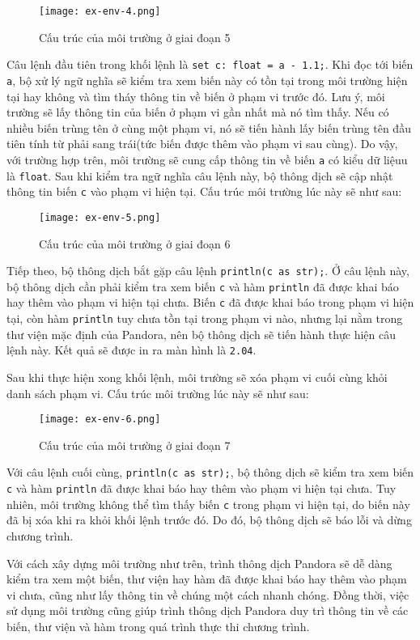 \begin{figure}[H]
    \centering
    \texttt{[image: ex-env-4.png]}
    \caption{Cấu trúc của môi trường ở giai đoạn 5}
\end{figure}

    Câu lệnh đầu tiên trong khối lệnh là \texttt{set c: float = a - 1.1;}. Khi đọc tới biến \texttt{a}, bộ xử lý ngữ nghĩa sẽ kiểm tra xem biến này có tồn tại trong môi trường hiện tại hay không và tìm tháy thông tin về biến ở phạm vi trước đó. Lưu ý, môi trường sẽ lấy thông tin của biến ở phạm vi gần nhất mà nó tìm thấy. Nếu có nhiều biến trùng tên ở cùng một phạm vi, nó sẽ tiến hành lấy biến trùng tên đầu tiên tính từ phải sang trái(tức biến được thêm vào phạm vi sau cùng). Do vậy, với trường hợp trên, môi trường sẽ cung cấp thông tin về biến \texttt{a} có kiểu dữ liệuu là \texttt{float}. Sau khi kiểm tra ngữ nghĩa câu lệnh này, bộ thông dịch sẽ cập nhật thông tin biến \texttt{c} vào phạm vi hiện tại. Cấu trúc môi trường lúc này sẽ như sau:

\begin{figure}[H]
    \centering
    \texttt{[image: ex-env-5.png]}
    \caption{Cấu trúc của môi trường ở giai đoạn 6}
\end{figure}

    Tiếp theo, bộ thông dịch bắt gặp câu lệnh \texttt{println(c as str);}. Ở câu lệnh này, bộ thông dịch cần phải kiểm tra xem biến \texttt{c} và hàm \texttt{println} đã được khai báo hay thêm vào phạm vi hiện tại chưa. Biến \texttt{c} đã được khai báo trong phạm vi hiện tại, còn hàm \texttt{println} tuy chưa tồn tại trong phạm vi nào, nhưng lại nằm trong thư viện mặc định của Pandora, nên bộ thông dịch sẽ tiến hành thực hiện câu lệnh này. Kết quả sẽ được in ra màn hình là \texttt{2.04}.

    Sau khi thực hiện xong khối lệnh, môi trường sẽ xóa phạm vi cuối cùng khỏi danh sách phạm vi. Cấu trúc môi trường lúc này sẽ như sau:

\begin{figure}[H]
    \centering
    \texttt{[image: ex-env-6.png]}
    \caption{Cấu trúc của môi trường ở giai đoạn 7}
\end{figure}

    Với câu lệnh cuối cùng, \texttt{println(c as str);}, bộ thông dịch sẽ kiểm tra xem biến \texttt{c} và hàm \texttt{println} đã được khai báo hay thêm vào phạm vi hiện tại chưa. Tuy nhiên, môi trường không thể tìm thấy biến \texttt{c} trong phạm vi hiện tại, do biến này đã bị xóa khi ra khỏi khối lệnh trước đó. Do đó, bộ thông dịch sẽ báo lỗi và dừng chương trình.

    Với cách xây dựng môi trường như trên, trình thông dịch Pandora sẽ dễ dàng kiểm tra xem một biến, thư viện hay hàm đã được khai báo hay thêm vào phạm vi chưa, cũng như lấy thông tin về chúng một cách nhanh chóng. Đồng thời, việc sử dụng môi trường cũng giúp trình thông dịch Pandora duy trì thông tin về các biến, thư viện và hàm trong quá trình thực thi chương trình.

